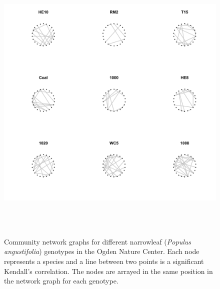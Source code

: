 \documentclass[11pt]{amsart}
\begin{document}
\begin{figure}[h]
\includegraphics[width=15cm,height=14cm]{Fig1}
\caption{Community network graphs for different narrowleaf (\textit{Populus angustifolia}) genotypes in the Ogden Nature Center. Each node represents a species and a line between two points is a significant Kendall's correlation. The nodes are arrayed in the same position in the network graph for each genotype.}
\end{figure}
\end{document}
